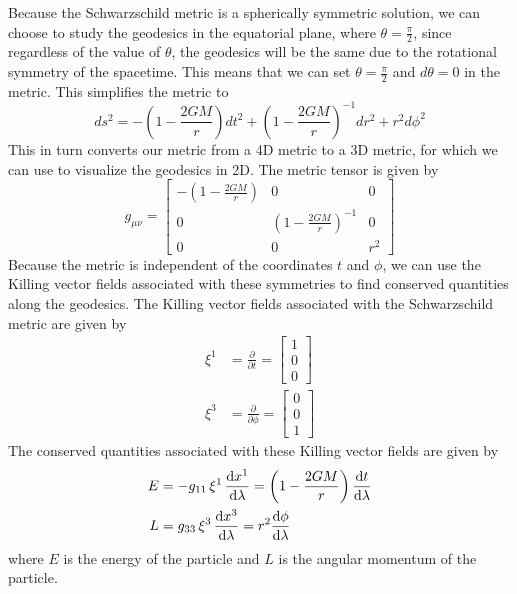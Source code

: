 \documentclass[12pt]{article}
\begin{document}
Because the Schwarzschild metric is a spherically symmetric solution, we can choose to study the geodesics in the equatorial plane, where \(\theta = \frac{\pi}{2}\), since regardless of the value of \(\theta\), the geodesics will be the same due to the rotational symmetry of the spacetime.
This means that we can set \(\theta = \frac{\pi}{2}\) and \(d\theta = 0\) in the metric.
This simplifies the metric to
\begin{equation}\label{eq:schwarzschild_metric_equatorial}
	ds^2 = -\left(1 - \frac{2GM}{r}\right) dt^2 + \left(1 - \frac{2GM}{r}\right)^{-1} dr^2 + r^2 d\phi^2
\end{equation}
This in turn converts our metric from a 4D metric to a 3D metric, for which we can use to visualize the geodesics in 2D.
The metric tensor is given by
\[
	g_{\mu\nu} = \begin{bmatrix}
	-\left(1 - \frac{2GM}{r}\right) & 0 & 0 \\
	0 & \left(1 - \frac{2GM}{r}\right)^{-1} & 0 \\
	0 & 0 & r^2
	\end{bmatrix}
\]
Because the metric is independent of the coordinates \(t\) and \(\phi\), we can use the Killing vector fields associated with these symmetries to find conserved quantities along the geodesics.
The Killing vector fields associated with the Schwarzschild metric are given by
\begin{align*}
	\xi^{1} &= \frac{\partial}{\partial t} = \begin{bmatrix} 1 \\ 0 \\ 0 \end{bmatrix} \\
	\xi^{3} &= \frac{\partial}{\partial \phi} = \begin{bmatrix} 0 \\ 0 \\ 1 \end{bmatrix}
\end{align*}
The conserved quantities associated with these Killing vector fields are given by
\begin{align}
	E &= -g_{11} \, \xi^{1} \, \dv{x^{1}}{\lambda} = \left(1 - \frac{2GM}{r}\right) \dv{t}{\lambda} \label{eq:energy} \\
	L &= g_{33} \, \xi^{3} \, \dv{x^{3}}{\lambda} = r^2 \dv{\phi}{\lambda} \label{eq:angular_momentum}
\end{align}
where \(E\) is the energy of the particle and \(L\) is the angular momentum of the particle.
\end{document}
